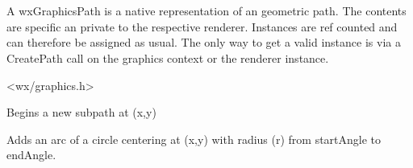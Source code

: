 
\section{}\label{wxgraphicspath}

A wxGraphicsPath is a native representation of an geometric path. The contents are specific an private to the respective renderer. Instances are ref counted and can 
therefore be assigned as usual. The only way to get a valid instance is via a CreatePath call on the graphics context or the renderer instance.




<wx/graphics.h>


\label{wxgraphicspathmovetopoint}



Begins a new subpath at (x,y)

\label{wxgraphicspathaddarc}


Adds an arc of a circle centering at (x,y) with radius (r) from startAngle to endAngle.


\label{wxgraphicspathaddarctopoint}

